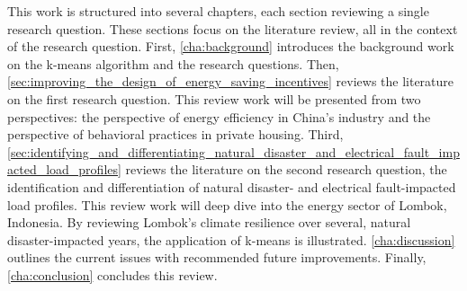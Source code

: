 This work is structured into several chapters, each section reviewing a single research question.
These sections focus on the literature review, all in the context of the research question.
First, \autoref{cha:background} introduces the background work on the k-means algorithm and the research questions.
Then, \autoref{sec:improving_the_design_of_energy_saving_incentives} reviews the literature on the first research question.
This review work will be presented from two perspectives: the perspective of energy efficiency in China's industry and the perspective of behavioral practices in private housing.
Third, \autoref{sec:identifying_and_differentiating_natural_disaster_and_electrical_fault_impacted_load_profiles} reviews the literature on the second research question, the identification and differentiation of natural disaster- and electrical fault-impacted load profiles. 
This review work will deep dive into the energy sector of Lombok, Indonesia.
By reviewing Lombok's climate resilience over several, natural disaster-impacted years, the application of k-means is illustrated.
\autoref{cha:discussion} outlines the current issues with recommended future improvements.
Finally, \autoref{cha:conclusion} concludes this review.
